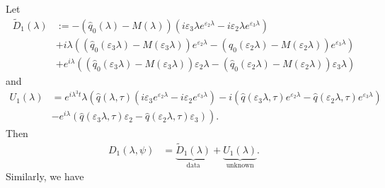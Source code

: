 Let 
\begin{align*}
    \widetilde{D}_1(\lambda) &:= - \left(\widehat{q}_0(\lambda) - M(\lambda)\right)\left(i\varepsilon_3\lambda e^{\varepsilon_2\lambda} - i\varepsilon_2\lambda e^{\varepsilon_3\lambda}\right)\\
    &+ i\lambda \left(\left(\widehat{q}_0(\varepsilon_3\lambda) - M(\varepsilon_3\lambda)\right)e^{\varepsilon_2\lambda} - \left(\widehat{q}_0(\varepsilon_2\lambda) - M(\varepsilon_2\lambda)\right)e^{\varepsilon_3\lambda}\right)\\
    &+ e^{i\lambda} \left(\left(\widehat{q}_0(\varepsilon_3\lambda) - M(\varepsilon_3\lambda)\right)\varepsilon_2\lambda - \left(\widehat{q}_0(\varepsilon_2\lambda) - M(\varepsilon_2\lambda)\right)\varepsilon_3\lambda\right)
\end{align*}
and
\begin{align*}
    U_1(\lambda) &= e^{i \lambda^3 t}\lambda\left(\widehat{q}(\lambda,\tau)\left(i\varepsilon_3e^{\varepsilon_2\lambda} - i\varepsilon_2e^{\varepsilon_3\lambda}\right) - i\left(\widehat{q}(\varepsilon_3\lambda,\tau)e^{\varepsilon_2\lambda} - \widehat{q}(\varepsilon_2\lambda,\tau)e^{\varepsilon_3\lambda}\right)\right.\\ 
    &- \left.e^{i\lambda}\left(\widehat{q}(\varepsilon_3\lambda,\tau)\varepsilon_2 - \widehat{q}(\varepsilon_2\lambda,\tau)\varepsilon_3\right)\right).
\end{align*}
Then 
\begin{align*}
    D_1(\lambda,\psi) &= \underbrace{\widetilde{D}_1(\lambda)}_\text{data} + \underbrace{U_1(\lambda)}_\text{unknown}.
\end{align*}
Similarly, we have 
